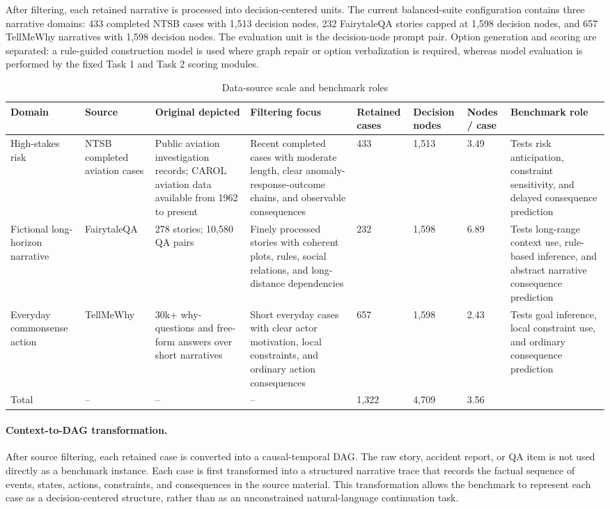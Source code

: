 \documentclass[pdflatex,sn-mathphys-num]{sn-jnl}%
\theoremstyle{thmstyleone}%
\theoremstyle{thmstyletwo}%
\theoremstyle{thmstylethree}%
\begin{document}
After filtering, each retained narrative is processed into decision-centered units. The current balanced-suite configuration contains three narrative domains: 433 completed NTSB cases with 1,513 decision nodes, 232 FairytaleQA stories capped at 1,598 decision nodes, and 657 TellMeWhy narratives with 1,598 decision nodes. The evaluation unit is the decision-node prompt pair. Option generation and scoring are separated: a rule-guided construction model is used where graph repair or option verbalization is required, whereas model evaluation is performed by the fixed Task 1 and Task 2 scoring modules.

\begin{table}
\centering
\small
\caption{Data-source scale and benchmark roles}
\label{tab:data-source-scale-and-benchmark-roles}
\begin{tabular}{p{}p{}p{}p{}p{}p{}p{}p{}}
\toprule
Domain & Source & Original depicted & Filtering focus & Retained cases & Decision nodes & Nodes / case & Benchmark role \\
\midrule
High-stakes risk & NTSB completed aviation cases & Public aviation investigation records; CAROL aviation data available from 1962 to present & Recent completed cases with moderate length, clear anomaly-response-outcome chains, and observable consequences & 433 & 1,513 & 3.49 & Tests risk anticipation, constraint sensitivity, and delayed consequence prediction \\
Fictional long-horizon narrative & FairytaleQA & 278 stories; 10,580 QA pairs & Finely processed stories with coherent plots, rules, social relations, and long-distance dependencies & 232 & 1,598 & 6.89 & Tests long-range context use, rule-based inference, and abstract narrative consequence prediction \\
Everyday commonsense action & TellMeWhy & 30k+ why-questions and free-form answers over short narratives & Short everyday cases with clear actor motivation, local constraints, and ordinary action consequences & 657 & 1,598 & 2.43 & Tests goal inference, local constraint use, and ordinary consequence prediction \\
Total & -- & -- & -- & 1,322 & 4,709 & 3.56 &  \\
\bottomrule
\end{tabular}
\end{table}

\paragraph{Context-to-DAG transformation.}
After source filtering, each retained case is converted into a causal-temporal DAG. The raw story, accident report, or QA item is not used directly as a benchmark instance. Each case is first transformed into a structured narrative trace that records the factual sequence of events, states, actions, constraints, and consequences in the source material. This transformation allows the benchmark to represent each case as a decision-centered structure, rather than as an unconstrained natural-language continuation task.
\end{document}
